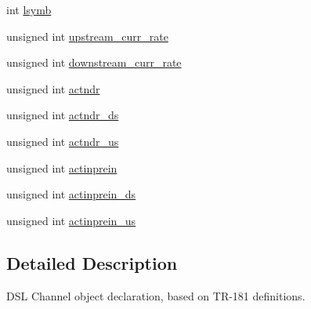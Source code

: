 \begin{DoxyCompactItemize}
int \hyperlink{structdsl__fapi__channel__obj_a68826db35d08bc1124ee09bf5ccdf7a4}{lsymb}
\item 
unsigned int \hyperlink{structdsl__fapi__channel__obj_a767b2e3a943d43f8f6114be408633486}{upstream\-\_\-curr\-\_\-rate}
\item 
unsigned int \hyperlink{structdsl__fapi__channel__obj_ab116fbbd314f1984713b84a9e9c0cf2f}{downstream\-\_\-curr\-\_\-rate}
\item 
unsigned int \hyperlink{structdsl__fapi__channel__obj_aac4a976754d78dde713ac994f3747e04}{actndr}
\item 
unsigned int \hyperlink{structdsl__fapi__channel__obj_a82ffc87c655718c66427f80533e49cdb}{actndr\-\_\-ds}
\item 
unsigned int \hyperlink{structdsl__fapi__channel__obj_aa12526963f84f3e5d2f47ab6d24c5af5}{actndr\-\_\-us}
\item 
unsigned int \hyperlink{structdsl__fapi__channel__obj_afb07611bd9eaae95be565a54d81bb8e2}{actinprein}
\item 
unsigned int \hyperlink{structdsl__fapi__channel__obj_af83f970357fcaddae397d639f8a010b1}{actinprein\-\_\-ds}
\item 
unsigned int \hyperlink{structdsl__fapi__channel__obj_a84244d655abf241d2987bdfde0e55923}{actinprein\-\_\-us}
\end{DoxyCompactItemize}


\subsection{Detailed Description}
D\-S\-L Channel object declaration, based on T\-R-\/181 definitions. 

